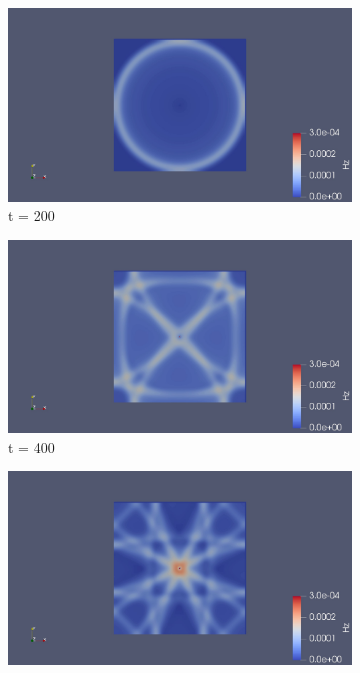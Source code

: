\begin{figure}
	\centering
	\begin{subfigure}{.49\textwidth}
		\centering
		\includegraphics[width=.95\linewidth]{Figures/FDTD2DH1}
		\caption{t = 200}
	\end{subfigure}
	\begin{subfigure}{.49\textwidth}
		\centering
		\includegraphics[width=.95\linewidth]{Figures/FDTD2DH2}
		\caption{t = 400}
	\end{subfigure}
	\begin{subfigure}{.49\textwidth}
		\centering
		\includegraphics[width=.95\linewidth]{Figures/FDTD2DH3}

\end{subfigure}
\end{figure}
